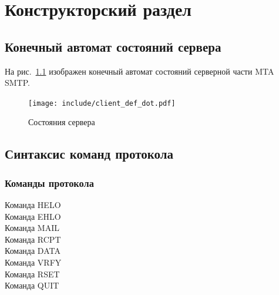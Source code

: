\documentclass[a4paper,12pt]{report}
\begin{document}
\chapter{Конструкторский раздел}

\section{Конечный автомат состояний сервера}


На рис.~\ref{fig:fsm} изображен конечный автомат состояний серверной части MTA SMTP. 

\begin{figure}
\centering
\texttt{[image: include/client\_def\_dot.pdf]}
\caption{Состояния сервера}
\label{fig:fsm}
\end{figure}

\section{Синтаксис команд протокола}

\subsection{Команды протокола}
\begin{description}
\item[Команда HELO]

\item[Команда EHLO]

\item[Команда MAIL]

\item[Команда RCPT]

\item[Команда DATA]

\item[Команда VRFY]

\item[Команда RSET]

\item[Команда QUIT]

\end{description}
\end{document}
